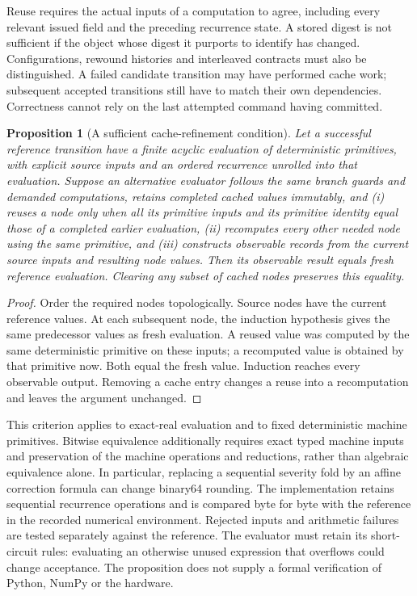\documentclass[11pt,a4paper]{article}
\newtheorem{proposition}[theorem]{Proposition}
\theoremstyle{definition}\newtheorem{definition}[theorem]{Definition}
\begin{document}
Reuse requires the actual inputs of a computation to agree, including every relevant issued field and the preceding recurrence state. A stored digest is not sufficient if the object whose digest it purports to identify has changed. Configurations, rewound histories and interleaved contracts must also be distinguished. A failed candidate transition may have performed cache work; subsequent accepted transitions still have to match their own dependencies. Correctness cannot rely on the last attempted command having committed.

\begin{proposition}[A sufficient cache-refinement condition]\label{prop:incrementalrefinement}
Let a successful reference transition have a finite acyclic evaluation of deterministic primitives, with explicit source inputs and an ordered recurrence unrolled into that evaluation. Suppose an alternative evaluator follows the same branch guards and demanded computations, retains completed cached values immutably, and (i) reuses a node only when all its primitive inputs and its primitive identity equal those of a completed earlier evaluation, (ii) recomputes every other needed node using the same primitive, and (iii) constructs observable records from the current source inputs and resulting node values. Then its observable result equals fresh reference evaluation. Clearing any subset of cached nodes preserves this equality.
\end{proposition}
\begin{proof}
Order the required nodes topologically. Source nodes have the current reference values. At each subsequent node, the induction hypothesis gives the same predecessor values as fresh evaluation. A reused value was computed by the same deterministic primitive on these inputs; a recomputed value is obtained by that primitive now. Both equal the fresh value. Induction reaches every observable output. Removing a cache entry changes a reuse into a recomputation and leaves the argument unchanged.
\end{proof}
This criterion applies to exact-real evaluation and to fixed deterministic machine primitives. Bitwise equivalence additionally requires exact typed machine inputs and preservation of the machine operations and reductions, rather than algebraic equivalence alone. In particular, replacing a sequential severity fold by an affine correction formula can change binary64 rounding. The implementation retains sequential recurrence operations and is compared byte for byte with the reference in the recorded numerical environment. Rejected inputs and arithmetic failures are tested separately against the reference. The evaluator must retain its short-circuit rules: evaluating an otherwise unused expression that overflows could change acceptance. The proposition does not supply a formal verification of Python, NumPy or the hardware.
\end{document}
